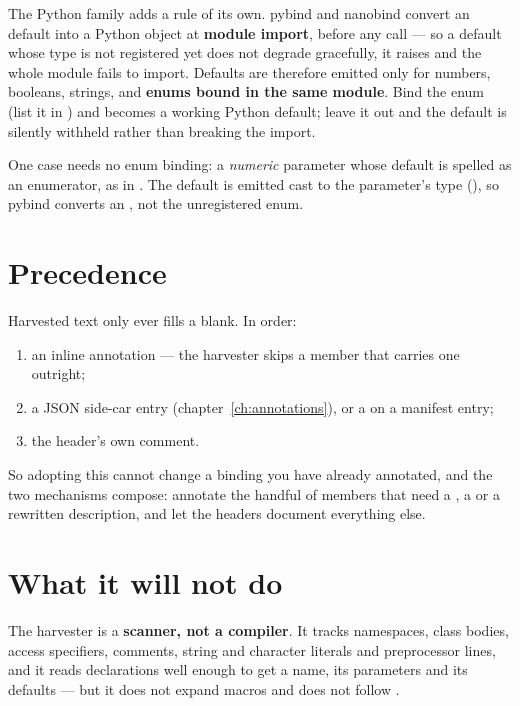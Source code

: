 \begin{warn}
The Python family adds a rule of its own. pybind and nanobind convert an
 default into a Python object at \textbf{module import}, before any
call --- so a default whose type is not registered yet does not degrade
gracefully, it raises  and the
whole module fails to import. Defaults are therefore emitted only for numbers,
booleans, strings, and \textbf{enums bound in the same module}. Bind the enum
(list it in ) and  becomes a working Python
default; leave it out and the default is silently withheld rather than breaking
the import.

One case needs no enum binding: a \emph{numeric} parameter whose default is
spelled as an enumerator, as in
. The default is emitted cast
to the parameter's type (), so pybind converts
an , not the unregistered enum.
\end{warn}

\section{Precedence}

Harvested text only ever fills a blank. In order:

\begin{enumerate}[leftmargin=*]
  \item an inline \code{[[= rosetta::doc\{"\ldots"\}]]} annotation --- the
    harvester skips a member that carries one outright;
  \item a JSON side-car entry (chapter~\ref{ch:annotations}), or a
     on a manifest  entry;
  \item the header's own comment.
\end{enumerate}

So adopting this cannot change a binding you have already annotated, and the
two mechanisms compose: annotate the handful of members that need a
, a  or a rewritten description, and let the headers
document everything else.

\section{What it will not do}

The harvester is a \textbf{scanner, not a compiler}. It tracks namespaces, class
bodies, access specifiers, comments, string and character literals and
preprocessor lines, and it reads declarations well enough to get a name, its
parameters and its defaults --- but it does not expand macros and does not
follow .

